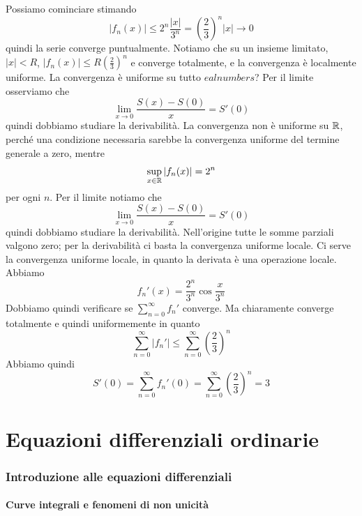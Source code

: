 \documentclass[a4paper]{article}
\begin{document}
\begin{radioactive}
\begin{snippetsolution}{}
    Possiamo cominciare stimando
    \[
        |f_n(x)| \leq 2^n\frac{|x|}{3^n} = \left(\frac23\right)^n |x| \to 0
    \]
    quindi la serie converge puntualmente.
    Notiamo che su un insieme limitato, \(|x| < R\),
    \(|f_n(x)| \leq R \left(\frac23\right)^n\)
    e converge totalmente, e la convergenza è localmente uniforme.
    La convergenza è uniforme su tutto \(
ealnumbers\)?
    Per il limite osserviamo che
    \[
        \lim_{x\to0}\frac{S(x)-S(0)}{x} = S'(0)
    \]
    quindi dobbiamo studiare la derivabilità.
    La convergenza non è uniforme su \(\mathbb{R}\), perché una condizione
    necessaria sarebbe la convergenza uniforme del termine generale a zero, mentre
    \[
        \sup_{x\in\mathbb{R}}|f_n(x)|=2^n
    \]
    per ogni \(n\).
    Per il limite notiamo che
    \[
        \lim_{x\to0}\frac{S(x)-S(0)}{x} = S'(0)
    \]
    quindi dobbiamo studiare la derivabilità.
    Nell'origine tutte le somme parziali valgono zero; per la derivabilità ci basta la convergenza uniforme locale.
    Ci serve la convergenza uniforme locale, in quanto la derivata è una operazione locale.
    Abbiamo
    \[
        f_n'(x) = \frac{2^n}{3^n} \cos \frac{x}{3^n}
    \]
    Dobbiamo quindi verificare se
    \(\sum_{n=0}^\infty f_n'\) converge. Ma chiaramente converge totalmente e quindi uniformemente in quanto
    \[
        \sum_{n=0}^\infty |f_n'| \leq \sum_{n=0}^\infty \left(\frac{2}{3}\right)^n
    \]
    Abbiamo quindi
    \[
        S'(0) = \sum_{n=0}^\infty f_n'(0) = \sum_{n=0}^\infty \left(\frac{2}{3}\right)^n = 3
    \]
\end{snippetsolution}
\end{radioactive}

\pagebreak

\part{Equazioni differenziali ordinarie}

\section{Introduzione alle equazioni differenziali}

\subsection{Curve integrali e fenomeni di non unicità}
\end{document}
